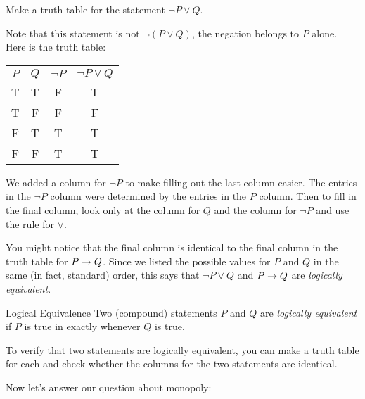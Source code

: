\documentclass[12pt]{article}
\begin{document}
\begin{example}
 Make a truth table for the statement $\neg P \vee Q$.

\begin{solution}
Note that this statement is not $\neg(P \vee Q)$, the negation belongs to $P$ alone.  Here is the truth table:

 \begin{center}
	 \begin{tabular}{c|c||c|c}
 $P$ & $Q$ & $\neg P$ & $\neg P \vee Q$ \\ \hline
 T & T & F & T\\
 T & F & F & F\\
 F & T & T & T\\
 F & F & T & T
\end{tabular}
\end{center}

We added a column for $\neg P$ to make filling out the last column easier.  The entries in the $\neg P$ column were determined by the entries in the $P$ column.  Then to fill in the final column, look only at the column for $Q$ and the column for $\neg P$ and use the rule for $\vee$.  


\end{solution}

\end{example}

You might notice that the final column is identical to the final column in the truth table for $P \rightarrow Q$.  Since we listed the possible values for $P$ and $Q$ in the same (in fact, standard) order, this says that $\neg P \vee Q$ and $P \rightarrow Q$ are {\em logically equivalent}.

\begin{defbox}{Logical Equivalence}
Two (compound) statements $P$ and $Q$ are \emph{logically equivalent}  if $P$ is true in exactly whenever $Q$ is true.

To verify that two statements are logically equivalent, you can make a truth table for each and check whether the columns for the two statements are identical.
\end{defbox}



Now let's answer our question about monopoly:
\end{document}
